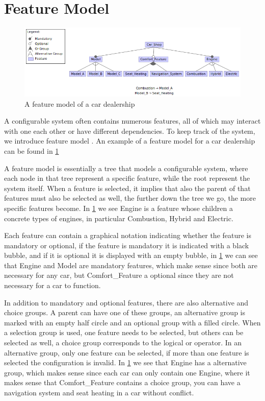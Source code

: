 \section{Feature Model}\label{ch:Feature Model}

\begin{figure}[h]
    \centering
    \includegraphics[scale=0.6]{gfx/Car_Shop.png}
    \caption{A feature model of a car dealership}
    \label{fig:car}
\end{figure}

A configurable system often contains numerous features, all of which may interact with one each other or have different dependencies.
To keep track of the system, we introduce feature model \cite{Feature-Oriented-Software-Product-Lines-Feature-models}. An example
of a feature model for a car dealership can be found in \ref{fig:car}

A feature model is essentially a tree that models a configurable system, where each node in that tree represent a specific feature, while the root
represent the system itself. When a feature is selected, it implies that also the parent of that features must also be selected as well, the further
down the tree we go, the more specific features become. In \ref{fig:car} we see Engine is a feature whose children a concrete types
of engines, in particular Combustion, Hybrid and Electric.

Each feature can contain a graphical notation indicating whether the feature is mandatory or optional, if the feature is mandatory it is 
indicated with a black bubble, and if it is optional it is displayed with an empty bubble, in \ref{fig:car} we can see that Engine and
Model are mandatory features, which make sense since both are necessary for any car, but Comfort\_Feature a optional since they are not
necessary for a car to function.

In addition to mandatory and optional features, there are also alternative and choice groups. A parent can have one of these groups, an alternative group
is marked with an empty half circle and an optional group with a filled circle. When a selection group is used, one feature needs to be selected, but
others can be selected as well, a choice group corresponds to the logical or operator. In an alternative group, only one feature can be
selected, if more than one feature is selected the configuration is invalid. In \ref{fig:car} we see that Engine has a alternative group, which makes sense
since each car can only contain one Engine, where it makes sense that Comfort\_Feature contains a choice group, you can have a navigation system
and seat heating in a car without conflict.

